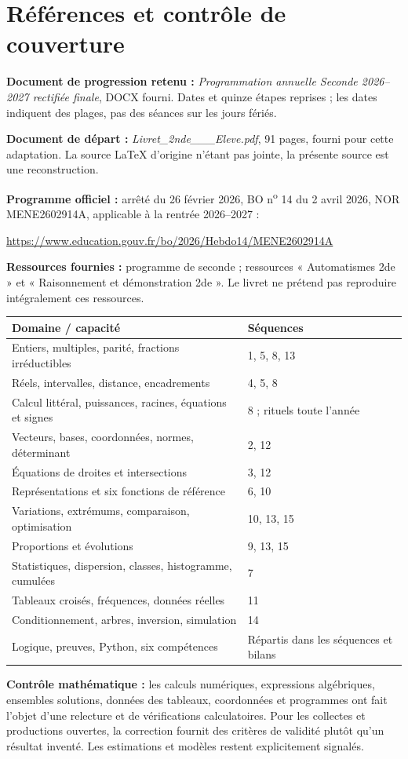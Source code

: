 \clearpage\section*{Références et contrôle de couverture}
\textbf{Document de progression retenu :} \emph{Programmation annuelle Seconde 2026--2027 rectifiée finale}, DOCX fourni. Dates et quinze étapes reprises ; les dates indiquent des plages, pas des séances sur les jours fériés.
\par\textbf{Document de départ :} \emph{Livret\_2nde\_\_\_Eleve.pdf}, 91 pages, fourni pour cette adaptation. La source LaTeX d'origine n'étant pas jointe, la présente source est une reconstruction.
\par\textbf{Programme officiel :} arrêté du 26 février 2026, BO n\textsuperscript{o} 14 du 2 avril 2026, NOR MENE2602914A, applicable à la rentrée 2026--2027 :
\par\url{https://www.education.gouv.fr/bo/2026/Hebdo14/MENE2602914A}
\par\textbf{Ressources fournies :} programme de seconde ; ressources « Automatismes 2de » et « Raisonnement et démonstration 2de ». Le livret ne prétend pas reproduire intégralement ces ressources.
\begin{center}\small\renewcommand{\arraystretch}{1.5}\begin{tabularx}{\linewidth}{p{8cm} X}
\textbf{Domaine / capacité}&\textbf{Séquences}\\\hline
Entiers, multiples, parité, fractions irréductibles&1, 5, 8, 13\\
Réels, intervalles, distance, encadrements&4, 5, 8\\
Calcul littéral, puissances, racines, équations et signes&8 ; rituels toute l'année\\
Vecteurs, bases, coordonnées, normes, déterminant&2, 12\\
Équations de droites et intersections&3, 12\\
Représentations et six fonctions de référence&6, 10\\
Variations, extrémums, comparaison, optimisation&10, 13, 15\\
Proportions et évolutions&9, 13, 15\\
Statistiques, dispersion, classes, histogramme, cumulées&7\\
Tableaux croisés, fréquences, données réelles&11\\
Conditionnement, arbres, inversion, simulation&14\\
Logique, preuves, Python, six compétences&Répartis dans les séquences et bilans
\end{tabularx}\end{center}
\textbf{Contrôle mathématique :} les calculs numériques, expressions algébriques, ensembles solutions, données des tableaux, coordonnées et programmes ont fait l'objet d'une relecture et de vérifications calculatoires. Pour les collectes et productions ouvertes, la correction fournit des critères de validité plutôt qu'un résultat inventé. Les estimations et modèles restent explicitement signalés.
\fi
